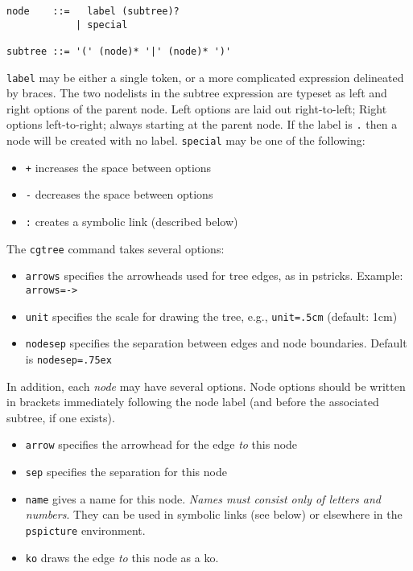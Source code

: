 \documentclass{article}
\begin{document}
\begin{verbatim}
node    ::=   label (subtree)?
            | special

subtree ::= '(' (node)* '|' (node)* ')'
\end{verbatim}

\texttt{label} may be either a single token, or a more complicated expression delineated by braces.  The two nodelists in the subtree expression are typeset as left and right options of the parent node.  Left options are laid out right-to-left; Right options left-to-right; always starting at the parent node.  If the label is \texttt{.} then a node will be created with no label.  \texttt{special} may be one of the following:

\begin{itemize}
\item \texttt{+} increases the space between options
\item \texttt{-} decreases the space between options
\item \texttt{:} creates a symbolic link (described below)
\end{itemize}

The \texttt{cgtree} command takes several options:

\begin{itemize}
\item \texttt{arrows} specifies the arrowheads used for tree edges, as in pstricks.  Example: \texttt{arrows=->}
\item \texttt{unit} specifies the scale for drawing the tree, e.g., \texttt{unit=.5cm} (default: 1cm)
\item \texttt{nodesep} specifies the separation between edges and node boundaries.  Default is \texttt{nodesep=.75ex}
\end{itemize}

In addition, each \emph{node} may have several options.  Node options should be written in brackets immediately following the node label (and before the associated subtree, if one exists).

\begin{itemize}
\item \texttt{arrow} specifies the arrowhead for the edge \emph{to} this node
\item \texttt{sep} specifies the separation for this node
\item \texttt{name} gives a name for this node.  \emph{Names must consist only of letters and numbers}.  They can be used in symbolic links (see below) or elsewhere in the \texttt{pspicture} environment.
\item \texttt{ko} draws the edge \emph{to} this node as a ko.
\end{itemize}
\end{document}
